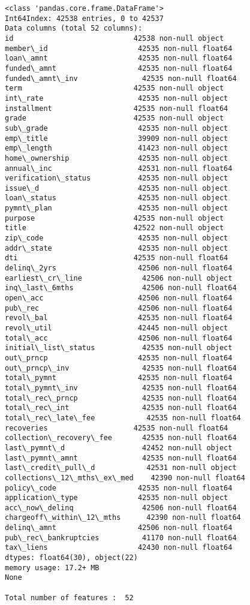 \documentclass[11pt]{article}
\begin{document}
    \begin{Verbatim}[commandchars=\\\{\}]
<class 'pandas.core.frame.DataFrame'>
Int64Index: 42538 entries, 0 to 42537
Data columns (total 52 columns):
id                            42538 non-null object
member\_id                     42535 non-null float64
loan\_amnt                     42535 non-null float64
funded\_amnt                   42535 non-null float64
funded\_amnt\_inv               42535 non-null float64
term                          42535 non-null object
int\_rate                      42535 non-null object
installment                   42535 non-null float64
grade                         42535 non-null object
sub\_grade                     42535 non-null object
emp\_title                     39909 non-null object
emp\_length                    41423 non-null object
home\_ownership                42535 non-null object
annual\_inc                    42531 non-null float64
verification\_status           42535 non-null object
issue\_d                       42535 non-null object
loan\_status                   42535 non-null object
pymnt\_plan                    42535 non-null object
purpose                       42535 non-null object
title                         42522 non-null object
zip\_code                      42535 non-null object
addr\_state                    42535 non-null object
dti                           42535 non-null float64
delinq\_2yrs                   42506 non-null float64
earliest\_cr\_line              42506 non-null object
inq\_last\_6mths                42506 non-null float64
open\_acc                      42506 non-null float64
pub\_rec                       42506 non-null float64
revol\_bal                     42535 non-null float64
revol\_util                    42445 non-null object
total\_acc                     42506 non-null float64
initial\_list\_status           42535 non-null object
out\_prncp                     42535 non-null float64
out\_prncp\_inv                 42535 non-null float64
total\_pymnt                   42535 non-null float64
total\_pymnt\_inv               42535 non-null float64
total\_rec\_prncp               42535 non-null float64
total\_rec\_int                 42535 non-null float64
total\_rec\_late\_fee            42535 non-null float64
recoveries                    42535 non-null float64
collection\_recovery\_fee       42535 non-null float64
last\_pymnt\_d                  42452 non-null object
last\_pymnt\_amnt               42535 non-null float64
last\_credit\_pull\_d            42531 non-null object
collections\_12\_mths\_ex\_med    42390 non-null float64
policy\_code                   42535 non-null float64
application\_type              42535 non-null object
acc\_now\_delinq                42506 non-null float64
chargeoff\_within\_12\_mths      42390 non-null float64
delinq\_amnt                   42506 non-null float64
pub\_rec\_bankruptcies          41170 non-null float64
tax\_liens                     42430 non-null float64
dtypes: float64(30), object(22)
memory usage: 17.2+ MB
None

Total number of features :  52

    \end{Verbatim}
\end{document}
